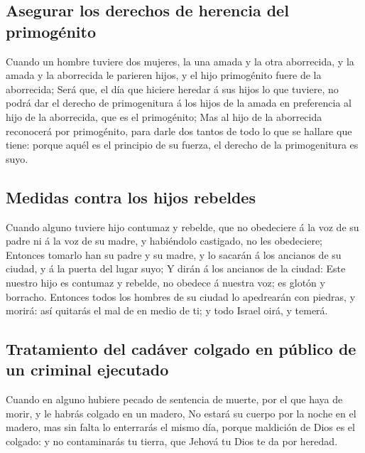 \hypertarget{asegurar-los-derechos-de-herencia-del-primoguxe9nito}{%
\subsection{Asegurar los derechos de herencia del
primogénito}\label{asegurar-los-derechos-de-herencia-del-primoguxe9nito}}

 Cuando un hombre tuviere dos mujeres, la una amada y la
otra aborrecida, y la amada y la aborrecida le parieren hijos, y el hijo
primogénito fuere de la aborrecida;  Será que, el día que
hiciere heredar á sus hijos lo que tuviere, no podrá dar el derecho de
primogenitura á los hijos de la amada en preferencia al hijo de la
aborrecida, que es el primogénito;  Mas al hijo de la
aborrecida reconocerá por primogénito, para darle dos tantos de todo lo
que se hallare que tiene: porque aquél es el principio de su fuerza, el
derecho de la primogenitura es suyo.

\hypertarget{medidas-contra-los-hijos-rebeldes}{%
\subsection{Medidas contra los hijos
rebeldes}\label{medidas-contra-los-hijos-rebeldes}}

 Cuando alguno tuviere hijo contumaz y rebelde, que no
obedeciere á la voz de su padre ni á la voz de su madre, y habiéndolo
castigado, no les obedeciere;  Entonces tomarlo han su
padre y su madre, y lo sacarán á los ancianos de su ciudad, y á la
puerta del lugar suyo;  Y dirán á los ancianos de la
ciudad: Este nuestro hijo es contumaz y rebelde, no obedece á nuestra
voz; es glotón y borracho.  Entonces todos los hombres de
su ciudad lo apedrearán con piedras, y morirá: así quitarás el mal de en
medio de ti; y todo Israel oirá, y temerá.

\hypertarget{tratamiento-del-caduxe1ver-colgado-en-puxfablico-de-un-criminal-ejecutado}{%
\subsection{Tratamiento del cadáver colgado en público de un criminal
ejecutado}\label{tratamiento-del-caduxe1ver-colgado-en-puxfablico-de-un-criminal-ejecutado}}

 Cuando en alguno hubiere pecado de sentencia de muerte,
por el que haya de morir, y le habrás colgado en un madero,
 No estará su cuerpo por la noche en el madero, mas sin
falta lo enterrarás el mismo día, porque maldición de Dios es el
colgado: y no contaminarás tu tierra, que Jehová tu Dios te da por
heredad.

